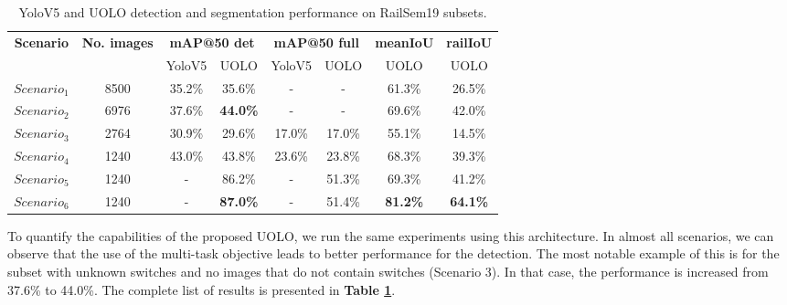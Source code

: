\documentclass[conference]{IEEEtran}
\begin{document}
\begin{table}[ht]
    \centering
    \caption{YoloV5 and UOLO detection and segmentation performance on RailSem19 subsets.}
    \begin{tabular}{cccccccc}
    \hline 
    \multirow{2}{*}{\textbf{Scenario}} & \multirow{2}{*}{\textbf{No. images}} & \multicolumn{2}{c}{\textbf{mAP@50 det}} & \multicolumn{2}{c}{\textbf{mAP@50 full}} & \textbf{meanIoU} & \textbf{railIoU} \\
    \cline{3-8} & & YoloV5 & UOLO & YoloV5 & UOLO & UOLO & UOLO \\
     \hline\hline
     $Scenario_1$ & 8500 & 35.2\% & 35.6\% & - & - & 61.3\% & 26.5\%\\ 
     \hline
     $Scenario_2$ & 6976 & 37.6\% & \textbf{44.0\%} & - & - & 69.6\% & 42.0\%\\ 
     \hline
     $Scenario_3$ & 2764 & 30.9\% & 29.6\% & 17.0\% & 17.0\% & 55.1\% & 14.5\%\\ 
     \hline
     $Scenario_4$& 1240 & 43.0\% & 43.8\% & 23.6\% & 23.8\% & 68.3\% & 39.3\%\\
     \hline
     $Scenario_5$ & 1240 & - & 86.2\% & - & 51.3\% & 69.3\% & 41.2\% \\
     \hline
     $Scenario_6$ & 1240 & - & \textbf{87.0\%} & - & 51.4\% & \textbf{81.2\%} & \textbf{64.1\%} \\
     \hline
    \end{tabular}
    \label{tab:exp_yolov5_railsem19_subsets2}
\end{table}

To quantify the capabilities of the proposed UOLO, we run the same experiments using this architecture. In almost all scenarios, we can observe that the use of the multi-task objective leads to better performance for the detection. The most notable example of this is for the subset with unknown switches and no images that do not contain switches  
(Scenario 3).
In that case, the performance is increased from 37.6\% to 44.0\%. The complete list of results is presented in \textbf{Table \ref{tab:exp_yolov5_railsem19_subsets2}}.
\end{document}
